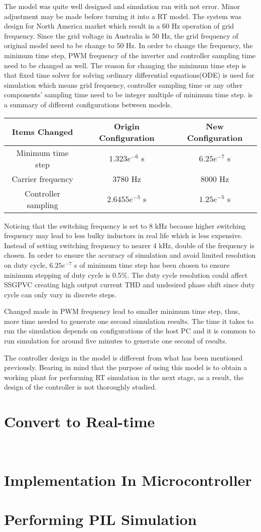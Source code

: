 The model was quite well designed and simulation ran with not error. Minor adjustment may be made before turning it into a \gls{RT} model. The system was design for North America market which result in a 60 Hz operation of grid frequency. Since the grid voltage in Australia is 50 Hz, the grid frequency of original model need to be change to 50 Hz. In order to change the frequency, the minimum time step, \gls{PWM} frequency of the inverter and controller sampling time need to be changed as well. The reason for changing the minimum time step is that fixed time solver for solving ordinary differential equations(ODE) is used for simulation which means grid frequency, controller sampling time or any other components' sampling time need to be integer multiple of minimum time step.  is a summary of different configurations between models. 
\begin{center}\label{tab:change_list}
\begin{tabular}{ |c|c|c| } 
 \hline
 Items Changed & Origin Configuration & New Configuration\\ \hline
 Minimum time step &  $1.323e^{-6}$ s & $6.25e^{-7}$ s \\ \hline
 Carrier frequency & 3780 Hz & 8000 Hz\\ \hline
 Controller sampling & $2.6455e^{-5}$ s& $1.25e^{-5}$ s\\ \hline
\end{tabular}
\end{center}

Noticing that the switching frequency is set to 8 kHz because higher switching frequency may lead to less bulky inductors in real life which is less expensive. Instead of setting switching frequency to nearer 4 kHz, double of the frequency is chosen. In order to ensure the accuracy of simulation and avoid limited resolution on duty cycle, $6.25e^{-7}$ s of minimum time step has been chosen to ensure minimum stepping of duty cycle is 0.5\%. The duty cycle resolution could affect \gls{SSGPVC} creating high output current THD and undesired phase shift since duty cycle can only vary in discrete steps.

Changed made in \gls{PWM} frequency lead to smaller minimum time step, thus, more time needed to generate one second simulation results. The time it takes to run the simulation depends on configurations of the host PC and it is common to run simulation for around five minutes to generate one second of results. 

The controller design in the model is different from what has been mentioned previously. Bearing in mind that the purpose of using this model is to obtain a working plant for performing \gls{RT} simulation in the next stage, as a result, the design of the controller is not thoroughly studied. 
 
\section{Convert to Real-time}\label{sec:convert_rt}\
\section{Implementation In Microcontroller}\label{sec:implement_micro}
\section{Performing \gls{PIL} Simulation}\label{sec:perform_pil}